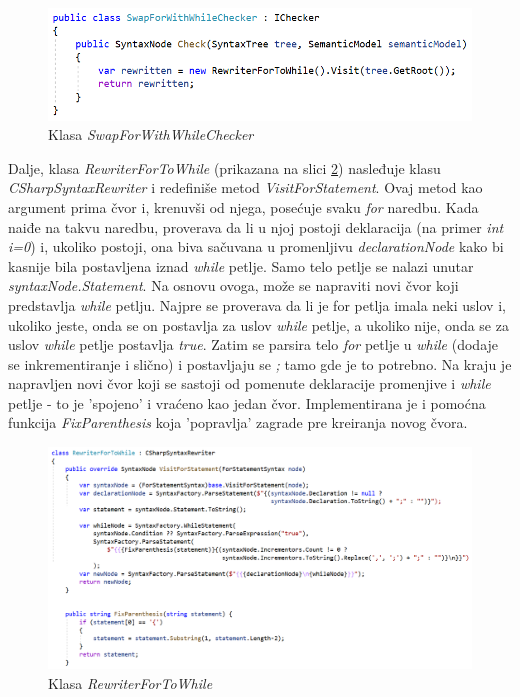 \documentclass[a4paper]{article}
\begin{document}
{\begin{figure}[h!]
\begin{center}
\includegraphics[scale=0.70]{images/SwapForWithWhileChecker.png}
\end{center}
\caption{Klasa \textit{SwapForWithWhileChecker}}
\label{fig:SwapForWithWhileChecker}
\end{figure}

Dalje, klasa \textit{RewriterForToWhile} (prikazana na slici \ref{fig:RewriterForToWhile}) nasleđuje klasu \textit{CSharpSyntaxRewriter} i redefiniše metod \textit{VisitForStatement}. Ovaj metod kao argument prima čvor i, krenuvši od njega, posećuje svaku \textit{for} naredbu. Kada naiđe na takvu naredbu, proverava da li u njoj postoji deklaracija (na primer \textit{int i=0}) i, ukoliko postoji, ona biva sačuvana u promenljivu \textit{declarationNode} kako bi kasnije bila postavljena iznad \textit{while} petlje. Samo telo petlje se nalazi unutar \textit{syntaxNode.Statement}. Na osnovu ovoga, može se napraviti novi čvor koji predstavlja \textit{while} petlju. Najpre se proverava da li je for petlja imala neki uslov i, ukoliko jeste, onda se on postavlja za uslov \textit{while} petlje, a ukoliko nije, onda se za uslov \textit{while} petlje postavlja \textit{true}. Zatim se parsira telo \textit{for} petlje u \textit{while} (dodaje se inkrementiranje i slično) i postavljaju se \textit{;} tamo gde je to potrebno. Na kraju je napravljen novi čvor koji se sastoji od pomenute deklaracije promenjive i \textit{while} petlje - to je 'spojeno' i vraćeno kao jedan čvor. Implementirana je i pomoćna funkcija \textit{FixParenthesis} koja 'popravlja' zagrade pre kreiranja novog čvora.

\begin{figure}[h!]
\begin{center}
\includegraphics[scale=0.44]{images/RewriterForToWhile.png}
\end{center}
\caption{Klasa \textit{RewriterForToWhile}}
\label{fig:RewriterForToWhile}
\end{figure}


}
\end{document}
